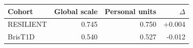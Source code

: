 \begin{tabular}{lrrr}
\toprule
Cohort & Global scale & Personal units & $\Delta$ \\
\midrule
RESILIENT & 0.745 & 0.750 & +0.004 \\
BrisT1D & 0.540 & 0.527 & -0.012 \\
\bottomrule
\end{tabular}